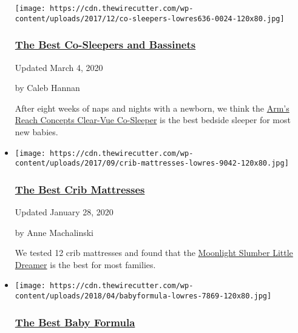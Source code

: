 \begin{itemize}
  \texttt{[image: https://cdn.thewirecutter.com/wp-content/uploads/2017/12/co-sleepers-lowres636-0024-120x80.jpg]}

  \hypertarget{the-best-co-sleepers-and-bassinets}{%
  \subsubsection{\texorpdfstring{\href{https://www.nytimes3xbfgragh.onion/wirecutter/reviews/best-co-sleepers/}{The
  Best Co-Sleepers and
  Bassinets}}{The Best Co-Sleepers and Bassinets}}\label{the-best-co-sleepers-and-bassinets}}

  Updated March 4, 2020

  by Caleb Hannan

  After eight weeks of naps and nights with a newborn, we think the
  \href{https://www.nytimes3xbfgragh.onion/wirecutter/out/link/7765/163297/4/69539/?merchant=Target}{Arm's
  Reach Concepts Clear-Vue Co-Sleeper} is the best bedside sleeper for
  most new babies.
\item
  \href{https://www.nytimes3xbfgragh.onion/wirecutter/reviews/best-crib-mattresses/}{}

  \texttt{[image: https://cdn.thewirecutter.com/wp-content/uploads/2017/09/crib-mattresses-lowres-9042-120x80.jpg]}

  \hypertarget{the-best-crib-mattresses}{%
  \subsubsection{\texorpdfstring{\href{https://www.nytimes3xbfgragh.onion/wirecutter/reviews/best-crib-mattresses/}{The
  Best Crib
  Mattresses}}{The Best Crib Mattresses}}\label{the-best-crib-mattresses}}

  Updated January 28, 2020

  by Anne Machalinski

  We tested 12 crib mattresses and found that the
  \href{https://www.nytimes3xbfgragh.onion/wirecutter/out/link/21235/0/4/62632/}{Moonlight
  Slumber Little Dreamer} is the best for most families.
\item
  \href{https://www.nytimes3xbfgragh.onion/wirecutter/reviews/best-baby-formula/}{}

  \texttt{[image: https://cdn.thewirecutter.com/wp-content/uploads/2018/04/babyformula-lowres-7869-120x80.jpg]}

  \hypertarget{the-best-baby-formula}{%
  \subsubsection{\texorpdfstring{\href{https://www.nytimes3xbfgragh.onion/wirecutter/reviews/best-baby-formula/}{The
  Best Baby
  Formula}}{The Best Baby Formula}}\label{the-best-baby-formula}}


\end{itemize}
